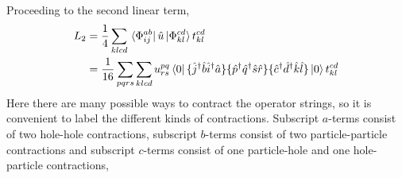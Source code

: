 Proceeding to the second linear term,
\begin{equation}
    \begin{aligned}
    L_2 &= \frac{1}{4}\sum_{klcd} \bra*{\Phi^{ab}_{ij}} \hat{u} \ket*{\Phi^{cd}_{kl}} t^{cd}_{kl} \\
        &= \frac{1}{16}\sum_{pqrs} \sum_{klcd} u^{pq}_{rs} \bra{0}
            \{\hat{j}^\dagger \hat{b} \hat{i}^\dagger  \hat{a} \}
            \{\hat{p}^\dagger \hat{q}^\dagger \hat{s} \hat{r} \}
            \{\hat{c}^\dagger \hat{d}^\dagger \hat{k} \hat{l} \}
        \ket{0}t^{cd}_{kl}
    \end{aligned}
\end{equation}
Here there are many possible ways to contract the operator strings, so it is convenient
to label the different kinds of contractions. Subscript $a$-terms consist of two
hole-hole contractions, subscript $b$-terms consist of two particle-particle
contractions and subscript $c$-terms consist of one particle-hole and one
hole-particle contractions,
